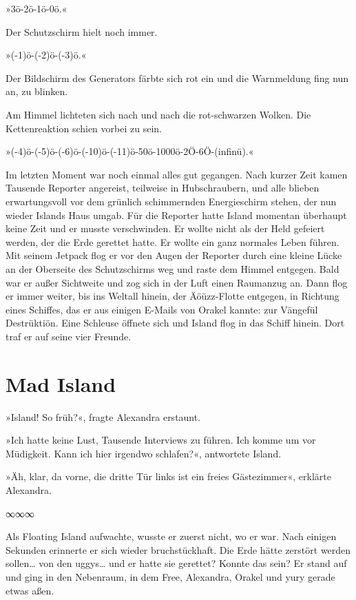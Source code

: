 »3ö-2ö-1ö-0ö.«

Der Schutzschirm hielt noch immer.

»(-1)ö-(-2)ö-(-3)ö.«

Der Bildschirm des Generators färbte sich rot ein und die Warnmeldung fing nun an, zu blinken.

Am Himmel lichteten sich nach und nach die rot-schwarzen Wolken. Die Kettenreaktion schien vorbei zu sein.

»(-4)ö-(-5)ö-(-6)ö-(-10)ö-(-11)ö-50ö-1000ö-2Ö-6Ö-(infinü).«

Im letzten Moment war noch einmal alles gut gegangen. Nach kurzer Zeit kamen Tausende Reporter angereist, teilweise in Hubschraubern, und alle blieben erwartungsvoll vor dem grünlich schimmernden Energieschirm stehen, der nun wieder Islands Haus umgab. Für die Reporter hatte Island momentan überhaupt keine Zeit und er musste verschwinden. Er wollte nicht als der Held gefeiert werden, der die Erde gerettet hatte. Er wollte ein ganz normales Leben führen. Mit seinem Jetpack flog er vor den Augen der Reporter durch eine kleine Lücke an der Oberseite des Schutzschirms weg und raste dem Himmel entgegen. Bald war er außer Sichtweite und zog sich in der Luft einen Raumanzug an. Dann flog er immer weiter, bis ins Weltall hinein, der Äöüzz-Flotte entgegen, in Richtung eines Schiffes, das er aus einigen E-Mails von Orakel kannte: zur Vängefül Destrüktiön. Eine Schleuse öffnete sich und Island flog in das Schiff hinein. Dort traf er auf seine vier Freunde.


\chapter{Mad Island}

»Island! So früh?«, fragte Alexandra erstaunt.

»Ich hatte keine Lust, Tausende Interviews zu führen. Ich komme um vor Müdigkeit. Kann ich hier irgendwo schlafen?«, antwortete Island.

»Äh, klar, da vorne, die dritte Tür links ist ein freies Gästezimmer«, erklärte Alexandra.

\begin{center}
    ∞∞∞
\end{center}

Als Floating Island aufwachte, wusste er zuerst nicht, wo er war. Nach einigen Sekunden erinnerte er sich wieder bruchstückhaft. Die Erde hätte zerstört werden sollen… von den uggys… und er hatte sie gerettet? Konnte das sein? Er stand auf und ging in den Nebenraum, in dem Free, Alexandra, Orakel und yury gerade etwas aßen.

